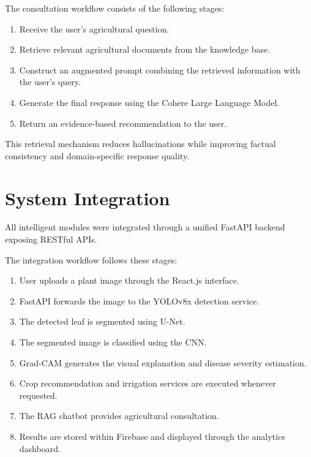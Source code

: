 The consultation workflow consists of the following stages:

\begin{enumerate}[leftmargin=*,label=\textbf{R\arabic*.}]

\item Receive the user's agricultural question.

\item Retrieve relevant agricultural documents from the knowledge base.

\item Construct an augmented prompt combining the retrieved information with the user's query.

\item Generate the final response using the Cohere Large Language Model.

\item Return an evidence-based recommendation to the user.

\end{enumerate}

This retrieval mechanism reduces hallucinations while improving factual consistency and domain-specific response quality.

\section{System Integration}
\label{sec:system_integration}

All intelligent modules were integrated through a unified FastAPI backend exposing RESTful APIs.

The integration workflow follows these stages:

\begin{enumerate}[leftmargin=*,label=\textbf{I\arabic*.}]

\item User uploads a plant image through the React.js interface.

\item FastAPI forwards the image to the YOLOv8x detection service.

\item The detected leaf is segmented using U-Net.

\item The segmented image is classified using the CNN.

\item Grad-CAM generates the visual explanation and disease severity estimation.

\item Crop recommendation and irrigation services are executed whenever requested.

\item The RAG chatbot provides agricultural consultation.

\item Results are stored within Firebase and displayed through the analytics dashboard.

\end{enumerate}

